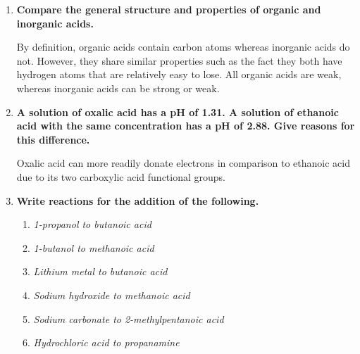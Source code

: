 \documentclass{report}
\begin{document}
\begin{enumerate}
		\item \textbf{Compare the general structure and properties of organic and inorganic acids.}

			By definition, organic acids contain carbon atoms whereas inorganic acids do not. However, they share similar properties such as the fact they both have hydrogen atoms that are relatively easy to lose. All organic acids are weak, whereas inorganic acids can be strong or weak.

		\item \textbf{A solution of oxalic acid has a pH of 1.31. A solution of ethanoic acid with the same concentration has a pH of 2.88. Give reasons for this difference.}

			Oxalic acid can more readily donate electrons in comparison to ethanoic acid due to its two carboxylic acid functional groups.

		\item \textbf{Write reactions for the addition of the following.}

			\begin{enumerate}
				\item \textit{1-propanol to butanoic acid}


				\item \textit{1-butanol to methanoic acid}


				\item \textit{Lithium metal to butanoic acid}


				\item \textit{Sodium hydroxide to methanoic acid}


				\item \textit{Sodium carbonate to 2-methylpentanoic acid}


				\item \textit{Hydrochloric acid to propanamine}


\end{enumerate}
\end{enumerate}
\end{document}
